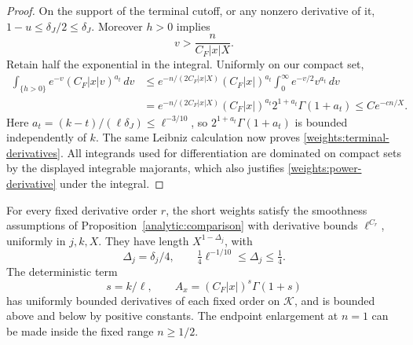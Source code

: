 \begin{proof}
On the support of the terminal cutoff, or any nonzero derivative
of it, \(1-u\le\delta_J/2\le\delta_J\).
Moreover \(h>0\) implies
\[
 v>\frac{n}{C_F|x|X}.
\]
Retain half the exponential in the integral. Uniformly on our
compact set,
\begin{equation}
 \begin{split}
 \int_{\{h>0\}}e^{-v}(C_F|x|v)^{a_t}\,dv
 &\le e^{-n/(2C_F|x|X)}
       (C_F|x|)^{a_t}
       \int_0^\infty e^{-v/2}v^{a_t}\,dv\\
 &=e^{-n/(2C_F|x|X)}
       (C_F|x|)^{a_t}2^{1+a_t}\Gamma(1+a_t)
 \le C e^{-cn/X}.
 \end{split}
 \label{weights:retained-exponential}
\end{equation}
Here \(a_t=(k-t)/(\ell\delta_J)\le\ell^{-3/10}\), so
\(2^{1+a_t}\Gamma(1+a_t)\) is bounded independently of \(k\).
The same Leibniz calculation now proves
\eqref{weights:terminal-derivatives}. All integrands used for
differentiation are dominated on compact sets by the displayed
integrable majorants, which also justifies
\eqref{weights:power-derivative} under the integral.
\end{proof}

\begin{corollary}
\label{weights:comparison-interface}
For every fixed derivative order \(r\), the short weights satisfy
the smoothness assumptions of Proposition~\ref{analytic:comparison}
with derivative bounds \(\ell^{C_r}\), uniformly in \(j,k,X\).
They have length \(X^{1-\Delta_j}\), with
\[
 \Delta_j=\delta_j/4,\qquad
 \tfrac14\ell^{-1/10}\le\Delta_j\le\tfrac14 .
\]
The deterministic term
\begin{equation}
 s=k/\ell,\qquad A_x=(C_F|x|)^s\Gamma(1+s)
 \label{weights:Ax}
\end{equation}
has uniformly bounded derivatives of each fixed order on
\(\mathcal K\), and is bounded above and below by positive constants.
The endpoint enlargement at \(n=1\) can be made inside the fixed
range \(n\ge1/2\).
\end{corollary}


